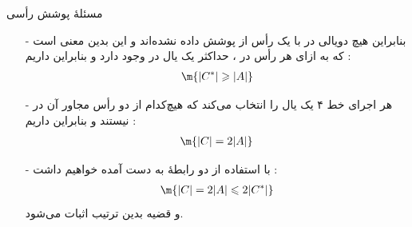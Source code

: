 \begin{frame}{‌مسئلهٔ پوشش رأسی}
\begin{itemize}\itemr
\item[-]
بنابراین هیچ دویالی در
با یک رأس از
پوشش داده نشده‌اند و این بدین معنی است که به ازای هر رأس در
، حداکثر یک یال در
وجود دارد و بنابراین داریم :
\begin{align*}
\m{|C^*| \geqslant |A|}
\end{align*}
\item[-]
هر اجرای خط ۴ یک یال را انتخاب می‌کند که هیچ‌کدام از دو رأس مجاور آن در
نیستند و بنابراین داریم :
\begin{align*}
\m{|C| = 2 |A|}
\end{align*}
\item[-]
با استفاده از دو رابطهٔ به دست آمده خواهیم داشت :
\begin{align*}
\m{|C| = 2 |A| \leqslant 2|C^*|}
\end{align*}
و قضیه بدین ترتیب اثبات می‌شود.
\end{itemize}
\end{frame}